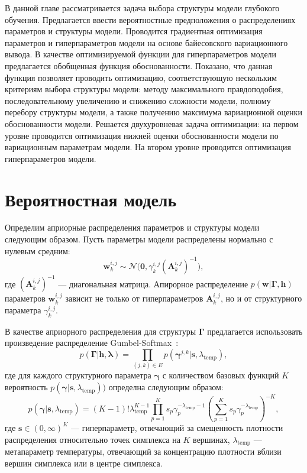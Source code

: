 В данной главе рассматривается задача выбора структуры модели глубокого обучения. Предлагается ввести вероятностные предположения о распределениях параметров и структуры модели. 
Проводится градиентная оптимизация параметров и гиперпараметров модели на основе байесовского вариационного вывода.  В качестве оптимизируемой функции для гиперпараметров модели предлагается обобщенная функция обоснованности. Показано, что данная функция позволяет проводить оптимизацию, соответствующую нескольким критериям выбора структуры модели: методу максимального правдоподобия, последовательному увеличению и снижению сложности модели, полному перебору структуры модели, а также получению максимума вариационной оценки обоснованности модели. Решается двухуровневая задача оптимизации: на первом уровне проводится оптимизация нижней оценки обоснованности модели по вариационным параметрам модели. На втором уровне проводится оптимизация гиперпараметров модели.

\section{Вероятностная модель}
Определим априорные распределения параметров и структуры модели следующим образом.
Пусть параметры модели распределены нормально с нулевым средним:
\[
    \mathbf{w}^{i,j}_k \sim \mathcal{N}\bigl(\mathbf{0}, \gamma^{i,j}_k(\mathbf{A}^{i,j}_k)^{-1}\bigr),
\]
где $ (\mathbf{A}^{i,j}_k)^{-1}$ --- диагональная матрица. Апирорное распределение $p(\mathbf{w}|\boldsymbol{\Gamma}, \mathbf{h})$ параметров $\mathbf{w}^{i,j}_k$ зависит не только от гиперпараметров $\mathbf{A}_k^{i,j}$, но и от структурного параметра $\gamma^{i,j}_k$.


В качестве априорного распределения для структуры $\boldsymbol{\Gamma}$ предлагается использовать произведение распределение Gumbel-Softmax~\cite{gs}:
\[
    p(\boldsymbol{\Gamma}|\mathbf{h},\boldsymbol{\lambda}) = \prod_{(j,k) \in E} p(\boldsymbol{\gamma}^{j,k}|\mathbf{s}, \lambda_\text{temp}),
\]
где для каждого структурного параметра $\boldsymbol{\gamma}$ с количеством базовых функций $K$ вероятность $p(\boldsymbol{\gamma}|\mathbf{s}, \lambda_\text{temp}))$ определна следующим образом:
\[
    p(\boldsymbol{\gamma}|\mathbf{s}, \lambda_\text{temp}) = (K-1)!\lambda_{\text{temp}}^{K-1}\prod_{p=1}^K s_p\gamma_p^{-\lambda_\text{temp} -1} \left(\sum_{p=1}^K s_p\gamma_p^{-\lambda_\text{temp}}\right)^{-K},
\]
где $\mathbf{s} \in (0,\infty)^K$ --- гиперпараметр, отвечающий за смещенность плотности распределения относительно точек симплекса на $K$ вершинах, $\lambda_{\text{temp}}$ --- метапараметр температуры, отвечающий за концентрацию плотности вблизи вершин симплекса или в центре симплекса.

